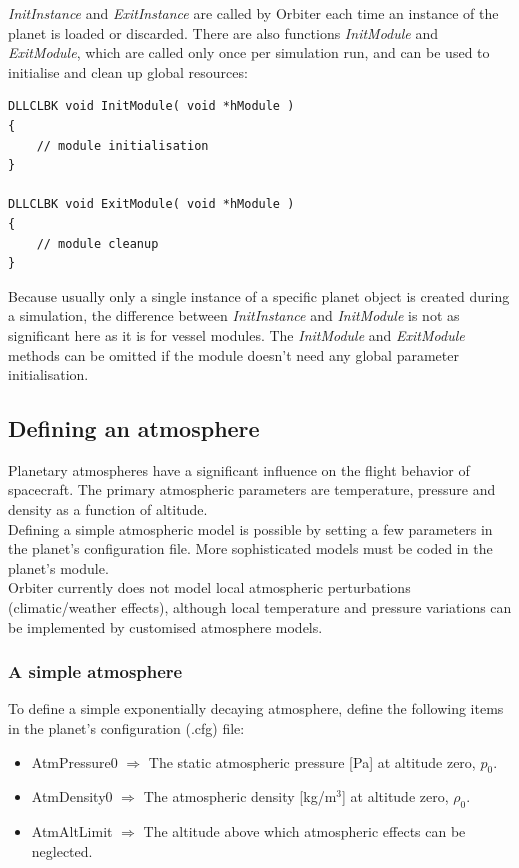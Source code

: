 \documentclass[Orbiter Developer Manual.tex]{subfiles}
\begin{document}
\noindent
\textit{InitInstance} and \textit{ExitInstance} are called by Orbiter each time an instance of the planet is loaded or discarded. There are also functions \textit{InitModule} and \textit{ExitModule}, which are called only once per simulation run, and can be used to initialise and clean up global resources:

\begin{lstlisting}
DLLCLBK void InitModule( void *hModule )
{
	// module initialisation
}

DLLCLBK void ExitModule( void *hModule )
{
	// module cleanup
}
\end{lstlisting}

\noindent
Because usually only a single instance of a specific planet object is created during a simulation, the difference between \textit{InitInstance} and \textit{InitModule} is not as significant here as it is for vessel modules. The \textit{InitModule} and \textit{ExitModule} methods can be omitted if the module doesn't need any global parameter initialisation.


\subsection{Defining an atmosphere}
Planetary atmospheres have a significant influence on the flight behavior of spacecraft. The primary atmospheric parameters are temperature, pressure and density as a function of altitude.\\
Defining a simple atmospheric model is possible by setting a few parameters in the planet's configuration file. More sophisticated models must be coded in the planet's module.\\
Orbiter currently does not model local atmospheric perturbations (climatic/weather effects), although local temperature and pressure variations can be implemented by customised atmosphere models.


\subsubsection{A simple atmosphere}
To define a simple exponentially decaying atmosphere, define the following items in the planet's configuration (.cfg) file:

\begin{itemize}
\item AtmPressure0 $\Rightarrow$ The static atmospheric pressure [Pa] at altitude zero, $p_{0}$.
\item AtmDensity0 $\Rightarrow$ The atmospheric density [kg/m$^{3}$] at altitude zero, $\rho_{0}$.
\item AtmAltLimit $\Rightarrow$ The altitude above which atmospheric effects can be neglected.
\end{itemize}
\end{document}
